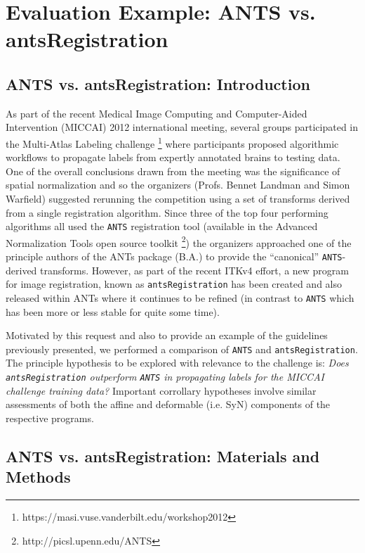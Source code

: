 \documentclass[final,5p,times,twocolumn]{elsarticle}
\begin{document}
\section{Evaluation Example:  ANTS vs. antsRegistration}

\subsection{ANTS vs. antsRegistration:  Introduction}
As part of the recent Medical Image Computing and Computer-Aided Intervention 
(MICCAI) 2012 international meeting, several groups participated in the 
Multi-Atlas Labeling challenge%
\footnote{
https://masi.vuse.vanderbilt.edu/workshop2012
}
where participants proposed algorithmic workflows to propagate
labels from expertly annotated brains to testing data.  One of 
the overall conclusions drawn from the meeting was the significance 
of spatial normalization and so the organizers (Profs. Bennet Landman and Simon
Warfield) suggested rerunning the competition using a set
of transforms derived from a single registration algorithm.
Since three of the top four performing algorithms all used
the \verb#ANTS# registration tool \cite{avants2011} (available
in the Advanced Normalization Tools open source 
toolkit%
\footnote{
http://picsl.upenn.edu/ANTS
}) the organizers approached one of the principle authors of
the ANTs package (B.A.) to provide the ``canonical'' 
\verb#ANTS#-derived transforms.  
However, as part of the recent ITKv4 effort, a new
program for image registration, known as \verb#antsRegistration#
has been created and also released within ANTs \cite{avants2012}
where it continues to be refined (in contrast to \verb#ANTS# which
has been more or less stable for quite some time).

Motivated by this request and also to provide an example of the 
guidelines previously presented, we performed a comparison of 
 \verb#ANTS# and \verb#antsRegistration#.  The principle hypothesis
 to be explored with relevance to the challenge is:  {\it Does
 \verb#antsRegistration# outperform \verb#ANTS# in propagating
 labels for the MICCAI challenge training data?}  Important 
 corrollary hypotheses involve similar assessments of both the
 affine and deformable (i.e. SyN) components of the respective
 programs.
 
\subsection{ANTS vs. antsRegistration:  Materials and Methods}
\end{document}

